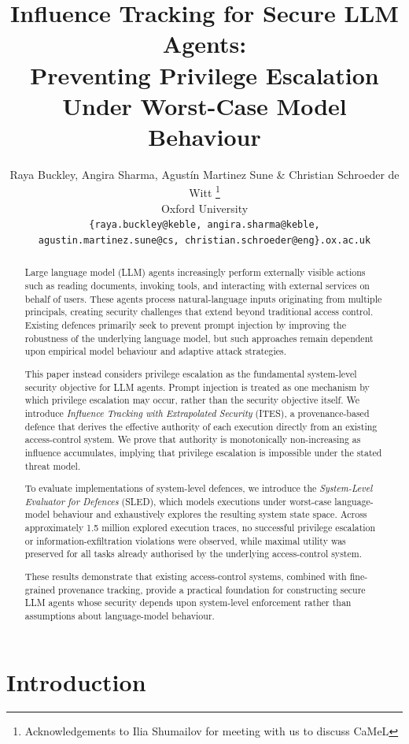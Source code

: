 \documentclass{article} %
\title{Influence Tracking for Secure LLM Agents:\\
Preventing Privilege Escalation Under Worst-Case Model Behaviour}
\author{Raya Buckley, Angira Sharma, Agustín Martinez Sune \& Christian Schroeder de Witt \thanks{ Acknowledgements to Ilia Shumailov for meeting with us to discuss CaMeL } \\
Oxford University\\
\texttt{\{raya.buckley@keble, angira.sharma@keble,} \\
\texttt{agustin.martinez.sune@cs, christian.schroeder@eng\}.ox.ac.uk} \\
}
\begin{document}
\maketitle
\begin{abstract}
Large language model (LLM) agents increasingly perform externally visible actions such as reading documents, invoking tools, and interacting with external services on behalf of users. These agents process natural-language inputs originating from multiple principals, creating security challenges that extend beyond traditional access control. Existing defences primarily seek to prevent prompt injection by improving the robustness of the underlying language model, but such approaches remain dependent upon empirical model behaviour and adaptive attack strategies.

This paper instead considers privilege escalation as the fundamental system-level security objective for LLM agents. Prompt injection is treated as one mechanism by which privilege escalation may occur, rather than the security objective itself. We introduce \emph{Influence Tracking with Extrapolated Security} (ITES), a provenance-based defence that derives the effective authority of each execution directly from an existing access-control system. We prove that authority is monotonically non-increasing as influence accumulates, implying that privilege escalation is impossible under the stated threat model.

To evaluate implementations of system-level defences, we introduce the \emph{System-Level Evaluator for Defences} (SLED), which models executions under worst-case language-model behaviour and exhaustively explores the resulting system state space. Across approximately 1.5 million explored execution traces, no successful privilege escalation or information-exfiltration violations were observed, while maximal utility was preserved for all tasks already authorised by the underlying access-control system.

These results demonstrate that existing access-control systems, combined with fine-grained provenance tracking, provide a practical foundation for constructing secure LLM agents whose security depends upon system-level enforcement rather than assumptions about language-model behaviour.
\end{abstract}




\section{Introduction}
\end{document}
